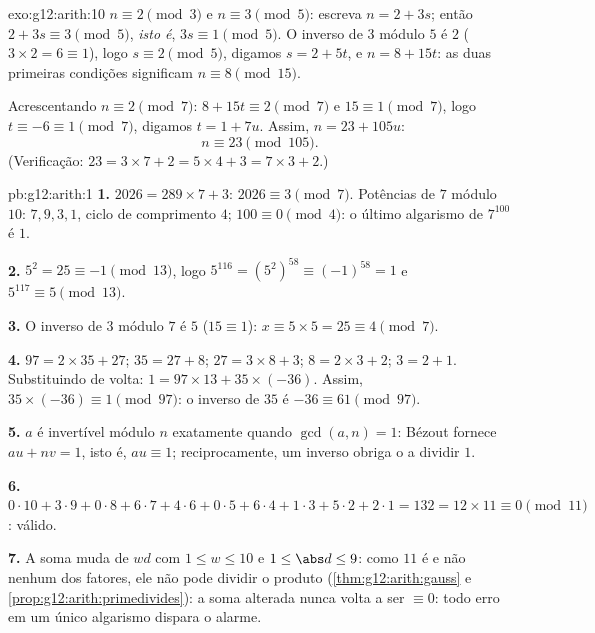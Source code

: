 \begin{solution}{exo:g12:arith:10}
$n \equiv 2 \pmod 3$ e $n \equiv 3 \pmod 5$: escreva $n = 2 + 3s$; então
$2 + 3s \equiv 3 \pmod 5$, \emph{isto é}, $3s \equiv 1 \pmod 5$. O inverso
de $3$ módulo $5$ é $2$ ($3\times2 = 6 \equiv 1$), logo
$s \equiv 2 \pmod 5$, digamos $s = 2 + 5t$, e $n = 8 + 15t$: as duas
primeiras condições significam $n \equiv 8 \pmod{15}$.

Acrescentando $n \equiv 2 \pmod 7$: $8 + 15t \equiv 2 \pmod 7$ e
$15 \equiv 1 \pmod 7$, logo $t \equiv -6 \equiv 1 \pmod 7$, digamos
$t = 1 + 7u$. Assim, $n = 23 + 105u$:
\[
n \equiv 23 \pmod{105}.
\]
(Verificação: $23 = 3\times7 + 2 = 5\times4 + 3 = 7\times3 + 2$.)
\end{solution}

\begin{solution}{pb:g12:arith:1}
\textbf{1.} $2026 = 289 \times 7 + 3$: $2026 \equiv 3 \pmod 7$.
Potências de $7$ módulo $10$: $7, 9, 3, 1$, ciclo de comprimento
$4$; $100 \equiv 0 \pmod 4$: o último algarismo de $7^{100}$ é
$1$.

\textbf{2.} $5^2 = 25 \equiv -1 \pmod{13}$, logo
$5^{116} = \left(5^2\right)^{58} \equiv (-1)^{58} = 1$ e
$5^{117} \equiv 5 \pmod{13}$.

\textbf{3.} O inverso de $3$ módulo $7$ é $5$
($15 \equiv 1$): $x \equiv 5 \times 5 = 25 \equiv 4 \pmod 7$.

\textbf{4.} $97 = 2 \times 35 + 27$; $35 = 27 + 8$;
$27 = 3 \times 8 + 3$; $8 = 2 \times 3 + 2$; $3 = 2 + 1$.
Substituindo de volta: $1 = 97 \times 13 + 35 \times (-36)$.
Assim, $35 \times (-36) \equiv 1 \pmod{97}$: o inverso de $35$ é
$-36 \equiv 61 \pmod{97}$.

\textbf{5.} $a$ é invertível módulo $n$ exatamente quando
$\gcd(a, n) = 1$: Bézout fornece $au + nv = 1$, isto é,
$au \equiv 1$; reciprocamente, um inverso obriga o  a dividir
$1$.

\textbf{6.} $0{\cdot}10 + 3{\cdot}9 + 0{\cdot}8 + 6{\cdot}7 +
4{\cdot}6 + 0{\cdot}5 + 6{\cdot}4 + 1{\cdot}3 + 5{\cdot}2 +
2{\cdot}1 = 132 = 12 \times 11 \equiv 0 \pmod{11}$: válido.

\textbf{7.} A soma muda de $wd$ com $1 \leq w \leq 10$ e
$1 \leq \abs d \leq 9$: como $11$ é  e não  nenhum
dos fatores, ele não pode dividir o produto
(\cref{thm:g12:arith:gauss} e
\cref{prop:g12:arith:primedivides}): a soma alterada nunca volta
a ser $\equiv 0$: todo erro em um único algarismo dispara o
alarme.


\end{solution}
